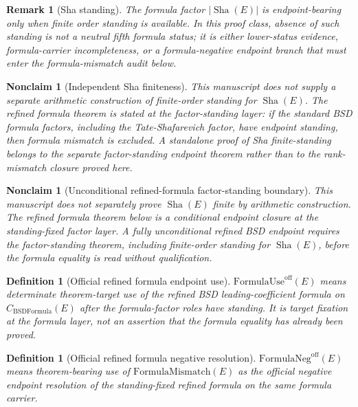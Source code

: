\documentclass[11pt]{article}
\newtheorem{definition}[theorem]{Definition}
\newtheorem{nonclaim}[theorem]{Nonclaim}
\newtheorem{remark}[theorem]{Remark}
\newcommand{\Sha}{\operatorname{Sha}}
\newcommand{\BSDFormula}{\mathrm{BSDFormula}}
\newcommand{\FormulaMismatch}{\mathrm{FormulaMismatch}}
\newcommand{\FormulaUse}{\mathrm{FormulaUse}^{\mathrm{off}}}
\newcommand{\FormulaNeg}{\mathrm{FormulaNeg}^{\mathrm{off}}}
\begin{document}
\begin{remark}[Sha standing]
The formula factor $|\Sha(E)|$ is endpoint-bearing only when finite order standing is available. In this proof class, absence of such standing is not a neutral fifth formula status; it is either lower-status evidence, formula-carrier incompleteness, or a formula-negative endpoint branch that must enter the formula-mismatch audit below.
\end{remark}

\begin{nonclaim}[Independent Sha finiteness]
This manuscript does not supply a separate arithmetic construction of finite-order standing for $\Sha(E)$. The refined formula theorem is stated at the factor-standing layer: if the standard BSD formula factors, including the Tate-Shafarevich factor, have endpoint standing, then formula mismatch is excluded. A standalone proof of Sha finite-standing belongs to the separate factor-standing endpoint theorem rather than to the rank-mismatch closure proved here.
\end{nonclaim}


\begin{nonclaim}[Unconditional refined-formula factor-standing boundary]
This manuscript does not separately prove $\Sha(E)$ finite by arithmetic construction. The refined formula theorem below is a conditional endpoint closure at the standing-fixed factor layer. A fully unconditional refined BSD endpoint requires the factor-standing theorem, including finite-order standing for $\Sha(E)$, before the formula equality is read without qualification.
\end{nonclaim}

\begin{definition}[Official refined formula endpoint use]\label{def:official-refined-formula-use}
$\FormulaUse(E)$ means determinate theorem-target use of the refined BSD leading-coefficient formula on $C_{\BSDFormula}(E)$ after the formula-factor roles have standing. It is target fixation at the formula layer, not an assertion that the formula equality has already been proved.
\end{definition}

\begin{definition}[Official refined formula negative resolution]\label{def:official-refined-formula-negative}
$\FormulaNeg(E)$ means theorem-bearing use of $\FormulaMismatch(E)$ as the official negative endpoint resolution of the standing-fixed refined formula on the same formula carrier.
\end{definition}
\end{document}

